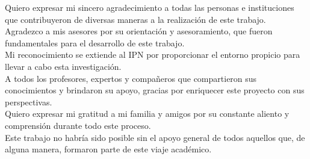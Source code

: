 Quiero expresar mi sincero agradecimiento a todas las personas e instituciones que contribuyeron de diversas maneras a la realización de este trabajo.\\
Agradezco a mis asesores por su orientación y asesoramiento, que fueron fundamentales para el desarrollo de este trabajo.\\
Mi reconocimiento se extiende al IPN por proporcionar el entorno propicio para llevar a cabo esta investigación.\\
A todos los profesores, expertos y compañeros que compartieron sus conocimientos y brindaron su apoyo, gracias por enriquecer este proyecto con sus perspectivas.\\
Quiero expresar mi gratitud a mi familia y amigos por su constante aliento y comprensión durante todo este proceso.\\
Este trabajo no habría sido posible sin el apoyo general de todos aquellos que, de alguna manera, formaron parte de este viaje académico.